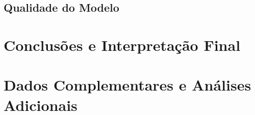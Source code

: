 \documentclass[12pt,a4paper]{article}
\begin{document}


\subsection{Qualidade do Modelo}



\section{Conclusões e Interpretação Final}



\appendix

\section{Dados Complementares e Análises Adicionais}


% 

% 

% 
\end{document}
